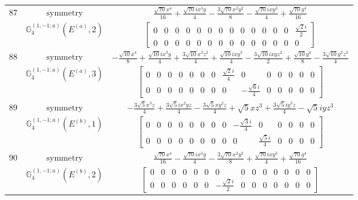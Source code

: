 \documentclass[fleqn,8pt,landscape]{jsarticle}
\begin{document}
\begin{longtable}{ccc}
$ 87 $ & $ \text{symmetry} $ & $ \frac{\sqrt{70} x^{4}}{16} + \frac{\sqrt{70} i x^{3} y}{4} - \frac{3 \sqrt{70} x^{2} y^{2}}{8} - \frac{\sqrt{70} i x y^{3}}{4} + \frac{\sqrt{70} y^{4}}{16} $ \\
$  $ & $ \mathbb{G}_{4}^{(1,-1;a)}(E^{(a)},2) $ & $ \begin{bmatrix} 0 & 0 & 0 & 0 & 0 & 0 & 0 & 0 & 0 & 0 & 0 & 0 & 0 & \frac{\sqrt{2} i}{2} \\ 0 & 0 & 0 & 0 & 0 & 0 & 0 & 0 & 0 & 0 & 0 & 0 & 0 & 0 \end{bmatrix} $ \\ \hline
$ 88 $ & $ \text{symmetry} $ & $ - \frac{\sqrt{10} x^{4}}{8} + \frac{\sqrt{10} i x^{3} y}{4} + \frac{3 \sqrt{10} x^{2} z^{2}}{4} + \frac{\sqrt{10} i x y^{3}}{4} - \frac{3 \sqrt{10} i x y z^{2}}{2} + \frac{\sqrt{10} y^{4}}{8} - \frac{3 \sqrt{10} y^{2} z^{2}}{4} $ \\
$  $ & $ \mathbb{G}_{4}^{(1,-1;a)}(E^{(a)},3) $ & $ \begin{bmatrix} 0 & 0 & 0 & 0 & 0 & 0 & 0 & \frac{\sqrt{2} i}{4} & 0 & 0 & 0 & 0 & 0 & 0 \\ 0 & 0 & 0 & 0 & 0 & 0 & 0 & 0 & - \frac{\sqrt{6} i}{4} & 0 & 0 & 0 & 0 & 0 \end{bmatrix} $ \\ \hline
$ 89 $ & $ \text{symmetry} $ & $ - \frac{3 \sqrt{5} x^{3} z}{4} + \frac{3 \sqrt{5} i x^{2} y z}{4} - \frac{3 \sqrt{5} x y^{2} z}{4} + \sqrt{5} x z^{3} + \frac{3 \sqrt{5} i y^{3} z}{4} - \sqrt{5} i y z^{3} $ \\
$  $ & $ \mathbb{G}_{4}^{(1,-1;a)}(E^{(b)},1) $ & $ \begin{bmatrix} 0 & 0 & 0 & 0 & 0 & 0 & 0 & 0 & - \frac{\sqrt{3} i}{4} & 0 & 0 & 0 & 0 & 0 \\ 0 & 0 & 0 & 0 & 0 & 0 & 0 & 0 & 0 & \frac{\sqrt{5} i}{4} & 0 & 0 & 0 & 0 \end{bmatrix} $ \\ \hline
$ 90 $ & $ \text{symmetry} $ & $ \frac{\sqrt{70} x^{4}}{16} - \frac{\sqrt{70} i x^{3} y}{4} - \frac{3 \sqrt{70} x^{2} y^{2}}{8} + \frac{\sqrt{70} i x y^{3}}{4} + \frac{\sqrt{70} y^{4}}{16} $ \\
$  $ & $ \mathbb{G}_{4}^{(1,-1;a)}(E^{(b)},2) $ & $ \begin{bmatrix} 0 & 0 & 0 & 0 & 0 & 0 & 0 & 0 & 0 & 0 & 0 & 0 & 0 & 0 \\ 0 & 0 & 0 & 0 & 0 & 0 & - \frac{\sqrt{2} i}{2} & 0 & 0 & 0 & 0 & 0 & 0 & 0 \end{bmatrix} $ \\ \hline

\end{longtable}
\end{document}
